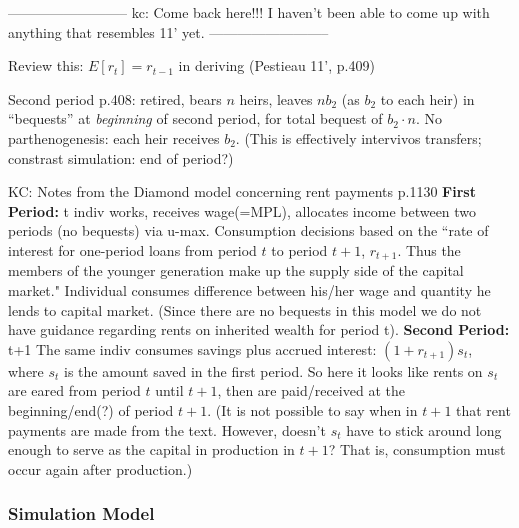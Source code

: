 \documentclass{article}
\begin{document}
--------------------------\newline
kc: Come back here!!! I haven't been able to come up with anything that resembles 11' yet.\newline
--------------------------


Review this:
$E[r_t] = r_{t-1}$ in deriving (Pestieau 11',  p.409)

Second period p.408:
retired,
bears $n$ heirs,
leaves $n b_{2}$ (as $b_{2}$ to each heir) in ``bequests'' at \emph{beginning} of second period,
for total bequest of $b_{2} \cdot n$.
No parthenogenesis: each heir receives $b_{2}$.
(This is effectively intervivos transfers;
constrast simulation: end of period?)\newline

KC: Notes from the Diamond model concerning rent payments p.1130\newline
\textbf{First Period:} t\newline
indiv works, receives wage(=MPL), allocates income between two periods (no bequests) via u-max.\newline
Consumption decisions based on the ``rate of interest for one-period loans from period $t$ to period $t+1$, $r_{t+1}$.  Thus the members of the younger generation make up the supply side of the capital market."\newline
Individual consumes difference between his/her wage and quantity he lends to capital market.  (Since there are no bequests in this model we do not have guidance regarding rents on inherited wealth for period t).\newline
\noindent\textbf{Second Period:} t+1 \newline
The same indiv consumes savings plus accrued interest: $(1+r_{t+1})s_t$, where $s_t$ is the amount saved in the first period.  So here it looks like rents on $s_t$ are eared from period $t$ until $t+1$, then are paid/received at the beginning/end(?) of period $t+1$.  (It is not possible to say when in $t+1$ that rent payments are made from the text.  However, doesn't $s_t$ have to stick around long enough to serve as the capital in production in $t+1$?  That is, consumption must occur again after production.)




\subsubsection{Simulation Model}
\end{document}
